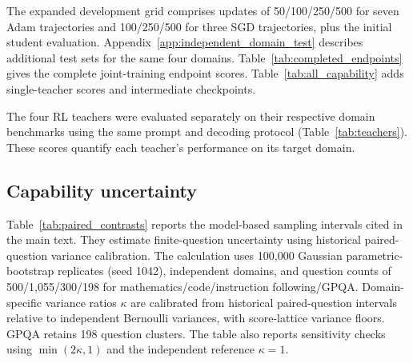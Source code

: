 The expanded development grid comprises updates of 50/100/250/500 for seven Adam trajectories and 100/250/500 for three SGD trajectories, plus the initial student evaluation. Appendix~\ref{app:independent_domain_test} describes additional test sets for the same four domains. Table~\ref{tab:completed_endpoints} gives the complete joint-training endpoint scores. Table~\ref{tab:all_capability} adds single-teacher scores and intermediate checkpoints.



\begin{table}[t]
\caption{\textbf{PG/I64 performance depends on the task and checkpoint.} Mean scores (\%): S is mathematics-only training and M is joint training; both use DR. Joint endpoints appear in Table~\ref{tab:completed_endpoints}.}
\label{tab:all_capability}
\centering\small

\end{table}

The four RL teachers were evaluated separately on their respective domain benchmarks using the same prompt and decoding protocol (Table~\ref{tab:teachers}). These scores quantify each teacher's performance on its target domain.

\begin{table}[t]
\caption{\textbf{Reference scores for the four domain-specific teachers} (\%). Science uses GPQA average@4.}
\label{tab:teachers}
\centering\small

\end{table}

\subsection{Capability uncertainty}
\label{app:capability_uncertainty}

Table~\ref{tab:paired_contrasts} reports the model-based sampling intervals cited in the main text. They estimate finite-question uncertainty using historical paired-question variance calibration. The calculation uses 100,000 Gaussian parametric-bootstrap replicates (seed 1042), independent domains, and question counts of 500/1,055/300/198 for mathematics/code/instruction following/GPQA. Domain-specific variance ratios $\kappa$ are calibrated from historical paired-question intervals relative to independent Bernoulli variances, with score-lattice variance floors. GPQA retains 198 question clusters. The table also reports sensitivity checks using $\min(2\kappa,1)$ and the independent reference $\kappa=1$.



